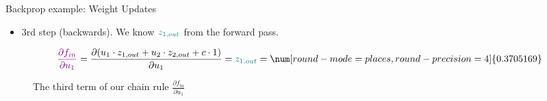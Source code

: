 \begin{vbframe}{Backprop example: Weight Updates}
  \begin{itemize}
    \item 3rd step (backwards).  We know $\textcolor{teal}{z_{1, out}}$ from the forward pass.
  \end{itemize}
    \begin{eqnarray*}
      \textcolor{violet}{\frac{\partial f_{in}}{\partial u_1}} = \frac{\partial (u_1 \cdot z_{1,out} + u_2 \cdot z_{2,out} + c \cdot 1)}{\partial u_1} = \textcolor{teal}{z_{1, out}} = \num[round-mode=places,round-precision=4]{0.3705169}
    \end{eqnarray*}
    \begin{figure}
      \centering
        \caption{The third term of our chain rule $\frac{\partial f_{in}}{\partial u_1}$}
    \end{figure}
\framebreak


\end{vbframe}

